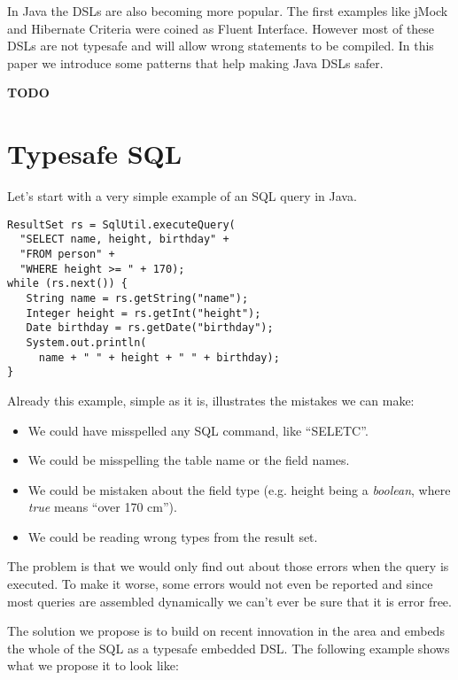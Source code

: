 \documentclass{sig-alternate}
\begin{document}
In Java the DSLs are also becoming more popular. The first examples like jMock \cite{freeman2004jsr} and Hibernate Criteria \cite{bauer2005ha} were coined as Fluent Interface. However most of these DSLs are not typesafe and will allow wrong statements to be compiled. In this paper we introduce some patterns that help making Java DSLs safer.

\textbf{TODO}

\section{Typesafe SQL}

Let's start with a very simple example of an SQL query in Java. 
\begin{verbatim}
ResultSet rs = SqlUtil.executeQuery(
  "SELECT name, height, birthday" + 
  "FROM person" +
  "WHERE height >= " + 170);
while (rs.next()) {
   String name = rs.getString("name");
   Integer height = rs.getInt("height");
   Date birthday = rs.getDate("birthday");
   System.out.println(
     name + " " + height + " " + birthday);
}
\end{verbatim}

Already this example, simple as it is, illustrates the mistakes we can make:
\begin{itemize}
\item We could have misspelled any SQL command, like ``SELETC''.
\item We could be misspelling the table name or the field names.
\item We could be mistaken about the field type (e.g. height being a \emph{boolean}, where \emph{true} means ``over 170 cm'').
\item We could be reading wrong types from the result set.
\end{itemize}
The problem is that we would only find out about those errors when the query is executed. To make it worse, some errors would not even be reported and since most queries are assembled dynamically we can't ever be sure that it is error free.

The solution we propose is to build on recent innovation in the area and embeds the whole of the SQL as a typesafe embedded DSL. The following example shows what we propose it to look like:
\end{document}
